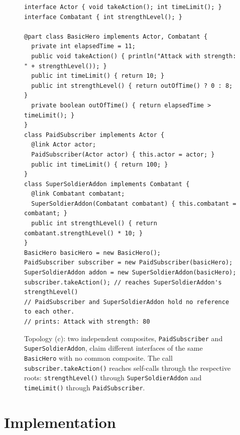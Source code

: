\documentclass[acmsmall,nonacm]{acmart}
\theoremstyle{acmplain}
\newcommand{\code}[1]{\texttt{#1}}
\begin{document}
\begin{figure}[H]
\begin{lstlisting}
interface Actor { void takeAction(); int timeLimit(); }
interface Combatant { int strengthLevel(); }

@part class BasicHero implements Actor, Combatant {
  private int elapsedTime = 11;
  public void takeAction() { println("Attack with strength: " + strengthLevel()); }
  public int timeLimit() { return 10; }
  public int strengthLevel() { return outOfTime() ? 0 : 8; }
  private boolean outOfTime() { return elapsedTime > timeLimit(); }
}
class PaidSubscriber implements Actor {
  @link Actor actor;
  PaidSubscriber(Actor actor) { this.actor = actor; }
  public int timeLimit() { return 100; }
}
class SuperSoldierAddon implements Combatant {
  @link Combatant combatant;
  SuperSoldierAddon(Combatant combatant) { this.combatant = combatant; }
  public int strengthLevel() { return combatant.strengthLevel() * 10; }
}
BasicHero basicHero = new BasicHero();
PaidSubscriber subscriber = new PaidSubscriber(basicHero);
SuperSoldierAddon addon = new SuperSoldierAddon(basicHero);
subscriber.takeAction(); // reaches SuperSoldierAddon's strengthLevel()
// PaidSubscriber and SuperSoldierAddon hold no reference to each other.
// prints: Attack with strength: 80
\end{lstlisting}
\caption{Topology (c): two independent composites, \code{PaidSubscriber} and
\code{SuperSoldierAddon}, claim different interfaces of the same \code{BasicHero} with no
common composite. The call \code{subscriber.takeAction()} reaches self-calls
through the respective roots: \code{strengthLevel()} through
\code{SuperSoldierAddon} and \code{timeLimit()} through \code{PaidSubscriber}.}
\label{fig:topology-c-listing}
\end{figure}

\section{Implementation}
\label{sec:impl}
\end{document}
